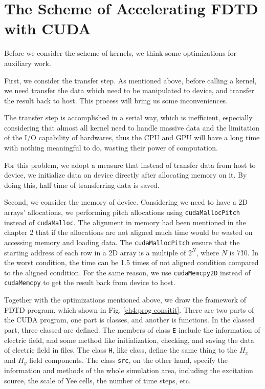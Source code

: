 \section{The Scheme of Accelerating FDTD with CUDA}

Before we consider the scheme of kernels, we think some optimizations for auxiliary work.

First, we consider the transfer step. As mentioned above, before calling a kernel, we need transfer the data which need to be manipulated to device, and transfer the result back to host. This process will bring us some inconveniences.

The transfer step is accomplished in a serial way, which is inefficient, especially considering that almost all kernel need to handle massive data and the limitation of the I/O capability of hardwares, thus the CPU and GPU will have a long time with nothing meaningful to do, wasting their power of computation. 

For this problem, we adopt a measure that instead of transfer data from host to device, we initialize data on device directly after allocating memory on it. By doing this, half time of transferring data is saved.

Second, we consider the memory of device. Considering we need to have a 2D arrays' allocations, we performing pitch allocations using \lstinline|cudaMallocPitch| instead of \lstinline|cudaMalloc|. The alignment in memory had been mentioned in the chapter 2 that if the allocations are not aligned much time would be wasted on accessing memory and loading data. The \lstinline|cudaMallocPitch| ensure that the starting address of each row in a 2D array is a multiple of $2^N$, where $N$ is 7\~10. In the worst condition, the time can be 1.5 times of not aligned condition compared to the aligned condition. For the same reason, we use \lstinline|cudaMemcpy2D| instead of \lstinline|cudaMemcpy| to get the result back from device to host.

Together with the optimizations mentioned above, we draw the framework of FDTD program, which shown in Fig. \ref{ch4:prog consitit}. There are two parts of the CUDA program, one part is classes, and another is functions. In the classed part, three classed are defined. The members of class \lstinline|E| include the information of electric field, and some method like initialization, checking, and saving the data of electric field in files. The class \lstinline|H|, like class, define the same thing to the $H_x$ and $H_y$ field components. The class \lstinline|src|, on the other hand, specify the information and methods of the whole simulation area, including the excitation source, the scale of Yee cells, the number of time steps, etc.

